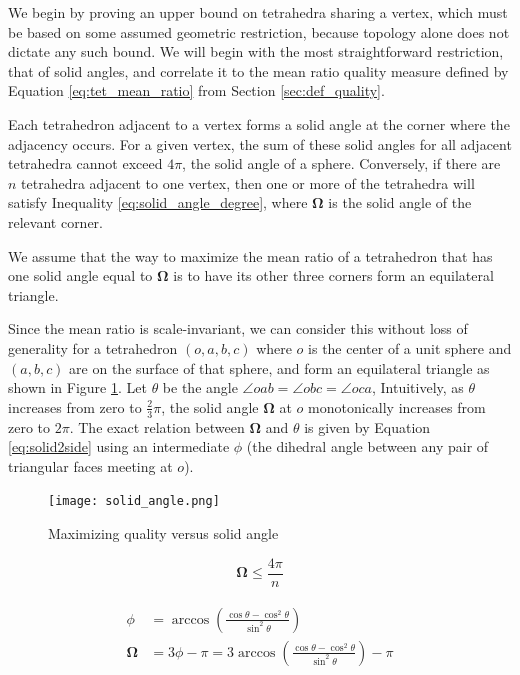 We begin by proving an upper bound on tetrahedra sharing a vertex,
which must be based on some assumed geometric restriction,
because topology alone does not dictate any such bound.
We will begin with the most straightforward restriction, that
of solid angles, and correlate it to the mean ratio quality measure
defined by Equation \ref{eq:tet_mean_ratio} from Section \ref{sec:def_quality}.

Each tetrahedron adjacent to a vertex forms a solid angle at
the corner where the adjacency occurs.
For a given vertex, the sum of these solid angles for all
adjacent tetrahedra cannot exceed $4\pi$, the solid angle of a sphere.
Conversely, if there are $n$ tetrahedra adjacent to one vertex,
then one or more of the tetrahedra will satisfy Inequality
\ref{eq:solid_angle_degree}, where $\mathbf{\Omega}$ is the
solid angle of the relevant corner.

We assume that the way to maximize the mean ratio of a tetrahedron
that has one solid angle equal to $\mathbf{\Omega}$ is to have
its other three corners form an equilateral triangle.

Since the mean ratio is scale-invariant, we can consider this
without loss of generality for a tetrahedron $(o,a,b,c)$ where
$o$ is the center of a unit sphere and $(a,b,c)$ are on the surface
of that sphere, and form an equilateral triangle
as shown in Figure \ref{fig:solid_angle}.
Let $\theta$ be the angle $\angle oab = \angle obc = \angle oca$,
Intuitively, as $\theta$ increases from zero to $\frac23\pi$,
the solid angle $\mathbf{\Omega}$ at $o$ monotonically
increases from zero to $2\pi$.
The exact relation between $\mathbf{\Omega}$ and $\theta$ is given by Equation
\ref{eq:solid2side}
using an intermediate $\phi$ (the dihedral angle between any pair of triangular
faces meeting at $o$).

\begin{figure}
\begin{center}
\texttt{[image: solid\_angle.png]}
\caption{Maximizing quality versus solid angle}
\label{fig:solid_angle}
\end{center}
\end{figure}

\begin{equation} \label{eq:solid_angle_degree}
\mathbf{\Omega} \leq \frac{4\pi}{n}
\end{equation}

\begin{gather} \label{eq:solid2side}
\begin{split}
\phi &= \arccos\left(\frac{\cos\theta - \cos^2\theta}{\sin^2\theta}\right) \\
\mathbf{\Omega} &= 3\phi - \pi = 3\arccos\left(\frac{\cos\theta - \cos^2\theta}{\sin^2\theta}\right) - \pi
\end{split}
\end{gather}

